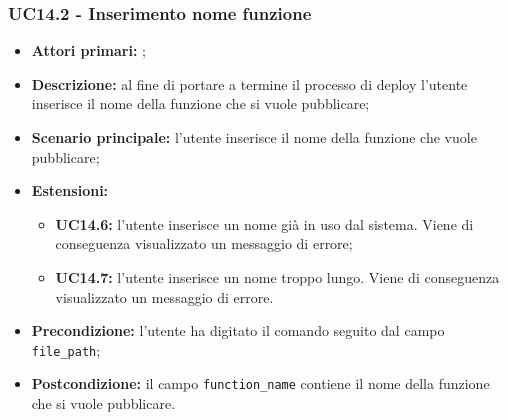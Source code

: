 \subsubsection{UC14.2 - Inserimento nome funzione}
\begin{itemize}
	\item \textbf{Attori primari:} \us{};
	\item \textbf{Descrizione:} al fine di portare a termine il processo di deploy l’utente inserisce il nome della funzione che si vuole pubblicare;  
	\item \textbf{Scenario principale:} l'utente inserisce il nome della funzione che vuole pubblicare;
	\item \textbf{Estensioni:} 
	\begin{itemize}
		\item \textbf{UC14.6:} l’utente inserisce un nome già in uso dal sistema. Viene di conseguenza visualizzato un messaggio di errore; 
		\item \textbf{UC14.7:} l’utente inserisce un nome troppo lungo. Viene di conseguenza visualizzato un messaggio di errore. 
	\end{itemize}
	\item \textbf{Precondizione:} l’utente ha digitato il comando \deploy{} seguito dal campo \texttt{file\_path};
	\item \textbf{Postcondizione:} il campo \texttt{function\_name} contiene il nome della funzione che si vuole pubblicare.
\end{itemize}